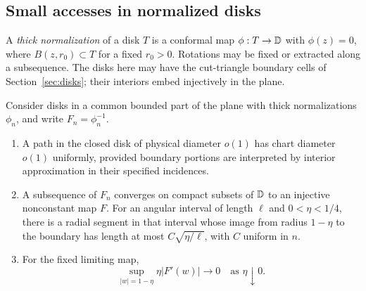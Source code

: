 \subsection{Small accesses in normalized disks}

A \emph{thick normalization} of a disk $T$ is a conformal map
$\phi:T\to\mathbb D$ with $\phi(z)=0$, where $B(z,r_0)\subset T$ for a
fixed $r_0>0$.  Rotations may be fixed or extracted along a subsequence.
The disks here may have the cut-triangle boundary cells of
Section~\ref{sec:disks}; their interiors embed injectively in the plane.

\begin{lemma}\label{chordal:access}
Consider disks in a common bounded part of the plane with thick
normalizations $\phi_n$, and write $F_n=\phi_n^{-1}$.
\begin{enumerate}[label=(\roman*)]
\item A path in the closed disk of physical diameter $o(1)$ has
chart diameter $o(1)$ uniformly, provided boundary portions are
interpreted by interior approximation in their specified incidences.
\item A subsequence of $F_n$ converges on compact subsets of $\mathbb D$
to an injective nonconstant map $F$.  For an angular interval of
length $\ell$ and $0<\eta<1/4$, there is a radial segment in that
interval whose image from radius $1-\eta$ to the boundary has length
at most $C\sqrt{\eta/\ell}$, with $C$ uniform in $n$.
\item For the fixed limiting map,
\begin{equation}\label{chordal:derivative-tail}
 \sup_{|w|=1-\eta}\eta |F'(w)|\longrightarrow0
 \quad\text{as }\eta\downarrow0.
\end{equation}
\end{enumerate}
\end{lemma}

